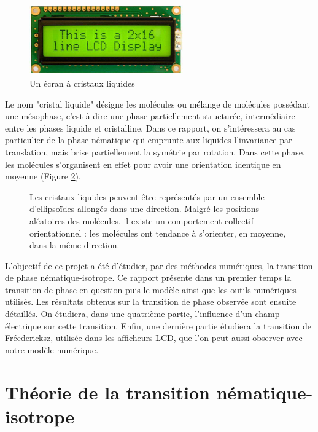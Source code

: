 \documentclass[11pt,a4paper]{article}
\numberwithin{equation}{section}
\begin{document}
\begin{figure}[h]
    \centering	    
	\includegraphics[height=3cm]{figures/lcd.jpg}
    \caption{Un écran à cristaux liquides}
    	\label{lcd} 
\end{figure}

Le nom "cristal liquide" désigne les molécules ou mélange de molécules possédant une mésophase, c'est à dire une phase partiellement structurée, intermédiaire entre les phases liquide et cristalline. Dans ce rapport, on s'intéressera au cas particulier de la phase nématique qui emprunte aux liquides l'invariance par translation, mais brise partiellement la symétrie par rotation. Dans cette phase, les molécules s'organisent en effet pour avoir une orientation identique en moyenne (Figure \ref{nematic_phase}).

\begin{figure}[h]
    \center
    
    \caption{Les cristaux liquides peuvent être représentés par un ensemble d'ellipsoïdes allongés dans une direction.
    Malgré les positions aléatoires des molécules, il existe un comportement collectif orientationnel : les molécules ont tendance à s'orienter, en moyenne, dans la même direction. }
    \label{nematic_phase}
\end{figure}

L'objectif de ce projet a été d'étudier, par des méthodes numériques, la transition de phase nématique-isotrope. Ce rapport présente dans un premier temps la transition de phase en question puis le modèle ainsi que les outils numériques utilisés. Les résultats obtenus sur la transition de phase observée sont ensuite détaillés. On étudiera, dans une quatrième partie, l'influence d'un champ électrique sur cette transition. Enfin, une dernière partie étudiera la transition de Fréedericksz, utilisée dans les afficheurs LCD, que l'on peut aussi observer avec notre modèle numérique.

\newpage
\section{Théorie de la transition nématique-isotrope}
\end{document}
